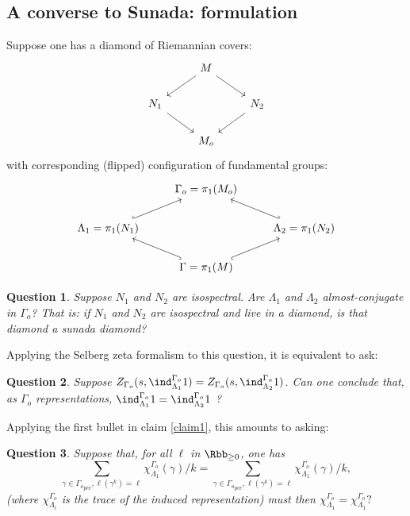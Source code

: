 \documentclass{amsart}
\newtheorem{question}{Question}
\begin{document}
\subsection{A converse to Sunada: formulation}
Suppose one has a diamond of Riemannian covers: 
	\[\begin{tikzcd}
		& M \\
		{N_1} && {N_2} \\
		& {M_o}
		\arrow[from=1-2, to=2-1]
		\arrow[from=1-2, to=2-3]
		\arrow[from=2-1, to=3-2]
		\arrow[from=2-3, to=3-2]
		\end{tikzcd}\]
with corresponding (flipped) configuration of fundamental groups: 
	\[\begin{tikzcd}
	& {\Gamma_o=\pi_1(M_o)} \\
	{\Lambda_1=\pi_1(N_1)} && {\Lambda_2=\pi_1(N_2)} \\
	& {\Gamma=\pi_1(M)}
	\arrow[hook, from=2-1, to=1-2]
	\arrow[hook, from=3-2, to=2-1]
	\arrow[hook', from=3-2, to=2-3]
	\arrow[hook', from=2-3, to=1-2]
	\end{tikzcd}\]
	\begin{question}
			Suppose $N_1$ and $N_2$ are isospectral. Are $\Lambda_1$ and $\Lambda_2$ almost-conjugate in $\Gamma_o$? That is: if $N_1$ and $N_2$ are isospectral and live in a diamond, is that diamond a sunada diamond? 
	\end{question}
	Applying the Selberg zeta formalism to this question, it is 	equivalent to ask:
	\begin{question}
		Suppose $Z_{\Gamma_o}(s, \ind_{\Lambda_1}^{\Gamma_o}1)  = Z_{\Gamma_o}(s, \ind_{\Lambda_2}^{\Gamma_o}1)$.  Can one conclude that, as $\Gamma_o$ representations, $\ind_{\Lambda_1}^{\Gamma_o}1=\ind_{\Lambda_2}^{\Gamma_o}1$ ?
	\end{question}
	Applying the first bullet in claim \ref{claim1}, this amounts to asking: 
	\begin{question}
		Suppose that, for all $\ell$ in $\Rbb_{\geq 0}$, one has 
			\[ \sum_{\gamma \in {\Gamma_o}_{pcc}, \ell(\gamma^k) = \ell }\chi_{\Lambda_1}^{\Gamma_o}(\gamma)/k   = \sum_{\gamma \in {\Gamma_o}_{pcc}, \ell(\gamma^k) = \ell } \chi_{\Lambda_1}^{\Gamma_o}(\gamma)/k, \] 
			(where $\chi_{\Lambda_i}^{\Gamma_o}$ is the trace of the induced representation) must then  $\chi_{\Lambda_1}^{\Gamma_o} =\chi_{\Lambda_1}^{\Gamma_o}?$
	\end{question}
\end{document}
